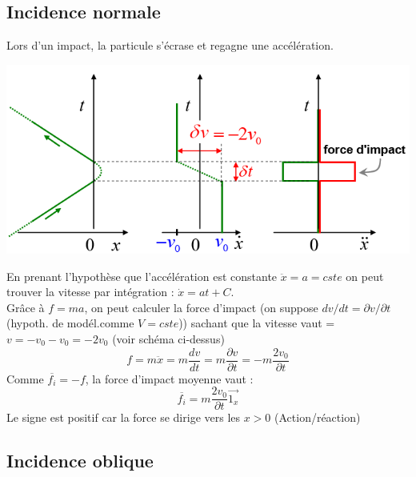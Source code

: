 \documentclass	[11pt, a4paper, openany]{book}
\begin{document}
\subsection{Incidence normale}
Lors d'un impact, la particule s'écrase et regagne une accélération.
\begin{center}
\includegraphics[scale=0.4]{th/image6.png}
\end{center}
En prenant l'hypothèse que l'accélération est constante $\ddot{x} = a = cste$ on peut trouver la vitesse par intégration  : $\dot{x} = at + C$.\\
Grâce à $f = ma$, on peut calculer la force d'impact (on suppose $dv/dt = \partial v / \partial t$ (hypoth. de modél.comme $V = cste$)) sachant que la vitesse vaut = $v = -v_0 - v_0 = -2v_0$ (voir schéma ci-dessus)
\begin{equation}
f = m\ddot{x} = m\frac{dv}{dt} = m\frac{\partial v}{\partial t} = -m\frac{2v_0}{\partial t}
\end{equation}
Comme $\overline{f_i} = -f$, la force d'impact moyenne vaut :
\begin{equation}
\overline{f_i} = m \frac{2v_0}{\partial t}\vec{1_x}
\end{equation}
Le signe est positif car la force se dirige vers les $x > 0$  (Action/réaction)

\subsection{Incidence oblique}
\end{document}
